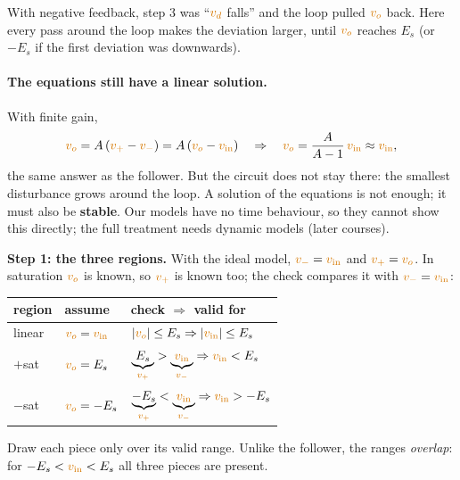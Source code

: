 \documentclass[11pt,a4paper]{article}
\newcommand{\Vcol}[1]{\textcolor{cvolt}{#1}}
\newcommand{\vin}{\Vcol{v_{\mathrm{in}}}}
\newcommand{\vo}{\Vcol{v_o}}
\newcommand{\vp}{\Vcol{v_+}}
\newcommand{\vm}{\Vcol{v_-}}
\newcommand{\Es}{E_s}
\newcommand{\tax}[6]{\draw[vax] (#1,0) -- (#2,0) node[right, font=\small] {#5};
  \draw[vax] (0,#3) -- (0,#4) node[above, font=\small] {#6};}
\newcommand{\xt}[2]{\draw ([yshift=2pt]#1,0) -- ([yshift=-2pt]#1,0) node[below, font=\scriptsize] {#2};}
\newcommand{\xtu}[2]{\draw ([yshift=2pt]#1,0) -- ([yshift=-2pt]#1,0); \node[above, font=\scriptsize] at (#1,0) {#2};}
\newcommand{\pfPlot}[1]{%
  \tax{-4.4}{4.8}{-3.0}{3.3}{$\vin$}{$\vo$}
  \draw[gdash] (2,0) -- (2,2); \draw[gdash] (-2,0) -- (-2,-2);
  \draw[crv] (-4.2,2) -- (2,2); \draw[crv] (-2,-2) -- (4.2,-2);
  \draw[crvu] (-2,-2) -- (2,2);
  \xt{2}{$\Es$} \xtu{-2}{$-\Es$}
  \ifnum#1=0
    \node[reg, above] at (-2.6,2) {$+$sat: $\vin < \Es$};
    \node[reg, below] at (2.6,-2) {$-$sat: $\vin > -\Es$};
    \node[reg, anchor=east] at (-0.3,1.2) {linear};
  \else
    \draw[swup, very thick, -{Stealth[length=2.6mm]}] (-4.0,2.35) -- (-0.6,2.35);
    \draw[swup, very thick, -{Stealth[length=2.6mm]}] (-0.4,2.35) -- (1.9,2.35);
    \draw[swup, very thick, -{Stealth[length=2.6mm]}] (2.3,2.0) -- (2.3,-1.85);
    \draw[swup, very thick, -{Stealth[length=2.6mm]}] (2.3,-2.35) -- (4.1,-2.35);
    \draw[swdn, very thick, densely dashed, -{Stealth[length=2.6mm]}] (4.0,-2.6) -- (0.6,-2.6);
    \draw[swdn, very thick, densely dashed, -{Stealth[length=2.6mm]}] (0.4,-2.6) -- (-1.9,-2.6);
    \draw[swdn, very thick, densely dashed, -{Stealth[length=2.6mm]}] (-2.6,-2.0) -- (-2.6,1.85);
    \draw[swdn, very thick, densely dashed, -{Stealth[length=2.6mm]}] (-2.6,2.6) -- (-4.1,2.6);
    \node[font=\scriptsize, text=swup, anchor=south] at (-3.0,2.8) {$\vin$ increasing};
    \node[font=\scriptsize, text=swdn, anchor=north] at (3.0,-2.8) {$\vin$ decreasing};
  \fi}
\begin{document}
\smallskip
With negative feedback, step 3 was ``$\Vcol{v_d}$ falls'' and the loop pulled $\vo$ back. Here
every pass around the loop makes the deviation larger, until $\vo$ reaches $\Es$ (or $-\Es$ if
the first deviation was downwards).

\paragraph{The equations still have a linear solution.} With finite gain,
\[
  \vo = A\,(\vp - \vm) = A\,(\vo - \vin)
  \quad\Rightarrow\quad
  \vo = \frac{A}{A - 1}\,\vin \approx \vin ,
\]
the same answer as the follower. But the circuit does not stay there: the smallest disturbance
grows around the loop. A solution of the equations is not enough; it must also be
\textbf{stable}. Our models have no time behaviour, so they cannot show this directly; the full
treatment needs dynamic models (later courses).

\textbf{Step 1: the three regions.} With the ideal model, $\vm = \vin$ and $\vp = \vo$. In
saturation $\vo$ is known, so $\vp$ is known too; the check compares it with $\vm = \vin$:\par\smallskip

\begin{center}
\renewcommand{\arraystretch}{1.3}
\begin{tabular}{@{}lll@{}}
\toprule
region & assume & check $\Rightarrow$ valid for\\
\midrule
linear & $\vo = \vin$ & $|\vo| \leq \Es \Rightarrow |\vin| \leq \Es$\\
$+$sat & $\vo = \Es$ & $\underbrace{\Es}_{\vp} > \underbrace{\vin}_{\vm} \Rightarrow \vin < \Es$\\
$-$sat & $\vo = -\Es$ & $\underbrace{-\Es}_{\vp} < \underbrace{\vin}_{\vm} \Rightarrow \vin > -\Es$\\
\bottomrule
\end{tabular}
\end{center}

\begin{minipage}[c]{0.5\linewidth}
Draw each piece only over its valid range. Unlike the follower, the ranges \emph{overlap}: for
$-\Es < \vin < \Es$ all three pieces are present.
\end{minipage}\hfill
\begin{minipage}[c]{0.46\linewidth}
\centering
{}
\end{minipage}
\end{document}
